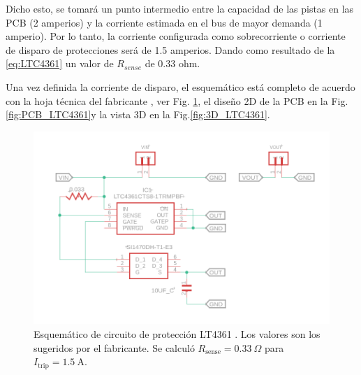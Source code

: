 Dicho esto, se tomará un punto intermedio entre la capacidad de las pistas en las PCB (2 amperios) y la corriente estimada en el bus de mayor demanda (1 amperio). Por lo tanto, la corriente configurada como sobrecorriente o corriente de disparo de protecciones será de 1.5 amperios. Dando como resultado de la \ref{eq:LTC4361} un valor de $R_{sense}$ de 0.33 ohm.

Una vez definida la corriente de disparo, el esquemático está completo de acuerdo con la hoja técnica del fabricante \cite{LTC4361}, ver Fig. \ref{fig:Esquematico_LTC4361}, el diseño 2D de la PCB en la Fig. \ref{fig:PCB_LTC4361}y la vista 3D en la Fig.\ref{fig:3D_LTC4361}. 

\newpage

\begin{figure}[h]
  \centering
  \includegraphics[width=\linewidth]{Pictures/Esquematico_LTC4361.png} 
  \caption{Esquemático de circuito de protección LT4361 \cite{LTC4361}. Los valores son los sugeridos por el fabricante. Se calculó \(R_{\text{sense}} = 0.33 \ \Omega\) para \(I_{\text{trip}} = 1.5 \ \text{A}\).}
  \label{fig:Esquematico_LTC4361}
\end{figure}
\vspace{1 cm}
